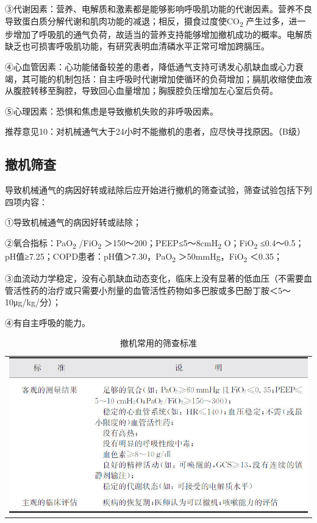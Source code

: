 ③代谢因素：营养、电解质和激素都是能够影响呼吸肌功能的代谢因素。营养不良导致蛋白质分解代谢和肌肉功能的减退；相反，摄食过度使CO\textsubscript{2}
产生过多，进一步增加了呼吸肌的通气负荷，故适当的营养支持能够增加撤机成功的概率。电解质缺乏也可损害呼吸肌功能，有研究表明血清磷水平正常可增加跨膈压。

④心血管因素：心功能储备较差的患者，降低通气支持可诱发心肌缺血或心力衰竭，其可能的机制包括：自主呼吸时代谢增加使循环的负荷增加；膈肌收缩使血液从腹腔转移至胸腔，导致回心血量增加；胸膜腔负压增加左心室后负荷。

⑤心理因素：恐惧和焦虑是导致撤机失败的非呼吸因素。

推荐意见10：对机械通气大于24小时不能撤机的患者，应尽快寻找原因。（B级）

\subsection{撤机筛查}

导致机械通气的病因好转或祛除后应开始进行撤机的筛查试验，筛查试验包括下列四项内容：

①导致机械通气的病因好转或祛除；

②氧合指标：PaO\textsubscript{2} /FiO\textsubscript{2}
＞150～200；PEEP≤5～8cmH\textsubscript{2} O；FiO\textsubscript{2}
≤0.4～0.5；pH值≥7.25；COPD患者：pH值＞7.30，PaO\textsubscript{2}
＞50mmHg，FiO\textsubscript{2} ＜0.35；

③血流动力学稳定，没有心肌缺血动态变化，临床上没有显著的低血压（不需要血管活性药的治疗或只需要小剂量的血管活性药物如多巴胺或多巴酚丁胺＜5～10μg/kg/分）；

④有自主呼吸的能力。

\begin{longtable}{c}
  \caption{撤机常用的筛查标准}
  \label{tabapp-6}
  \endfirsthead
  \caption[]{撤机常用的筛查标准}
  \endhead
\includegraphics[width=\textwidth,height=\textheight,keepaspectratio]{./images/Image00304.jpg}
\end{longtable}

